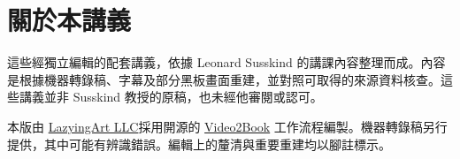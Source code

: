 \documentclass[11pt,oneside]{book}
\begin{document}
\frontmatter
\hypersetup{pageanchor=false}

\hypersetup{pageanchor=true}

\clearpage
\chapter*{關於本講義}
這些經獨立編輯的配套講義，依據 Leonard Susskind 的講課內容整理而成。內容是根據機器轉錄稿、字幕及部分黑板畫面重建，並對照可取得的來源資料核查。這些講義並非 Susskind 教授的原稿，也未經他審閱或認可。

本版由 \href{https://lazying.art}{LazyingArt LLC}採用開源的 \href{https://github.com/lachlanchen/Video2Book}{Video2Book} 工作流程編製。機器轉錄稿另行提供，其中可能有辨識錯誤。編輯上的釐清與重要重建均以腳註標示。
\clearpage
\tableofcontents
\mainmatter










\end{document}
